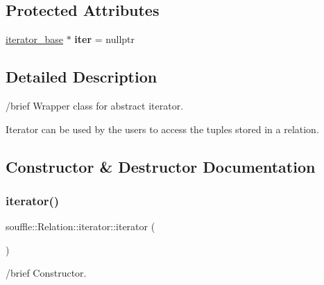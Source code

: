 \subsection*{Protected Attributes}
\begin{DoxyCompactItemize}
\item 
\mbox{\label{classsouffle_1_1_relation_1_1iterator_a3ca68bb806438f690c5839f6d22ae50c}} 
\hyperlink{classsouffle_1_1_relation_1_1iterator__base}{iterator\+\_\+base} $\ast$ {\bfseries iter} = nullptr
\end{DoxyCompactItemize}


\subsection{Detailed Description}
/brief Wrapper class for abstract iterator.

Iterator can be used by the users to access the tuples stored in a relation. 

\subsection{Constructor \& Destructor Documentation}
\mbox{\label{classsouffle_1_1_relation_1_1iterator_a8dac8928696b00e063b549675eafd5ed}} 
\subsubsection{\texorpdfstring{iterator()}{iterator()}\hspace{0.1cm}{\footnotesize\ttfamily [1/3]}}
{\footnotesize\ttfamily souffle\+::\+Relation\+::iterator\+::iterator (\begin{DoxyParamCaption}{ }\end{DoxyParamCaption})\hspace{0.3cm}{\ttfamily [default]}}

/brief Constructor. \mbox{\label{classsouffle_1_1_relation_1_1iterator_aa285ac4eed6c446a236d6f3cb84bf094}} 
